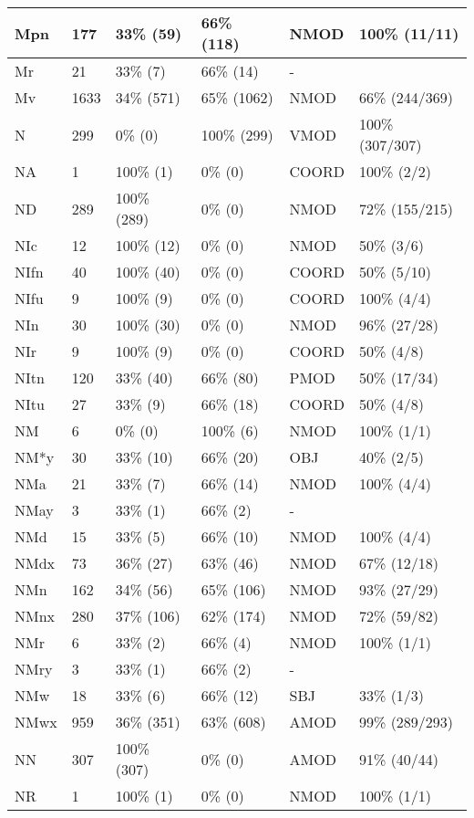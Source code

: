 \begin{figure*}
\begin{tabular}{|l|l|l|l||l|l|}
\hline
 Mpn & 177 & 33\% (59) & 66\% (118) & NMOD & 100\% (11/11) \\ 
\hline
 Mr & 21 & 33\% (7) & 66\% (14) & - &  \\ 
\hline
 Mv & 1633 & 34\% (571) & 65\% (1062) & NMOD & 66\% (244/369) \\ 
\hline
 N & 299 & 0\% (0) & 100\% (299) & VMOD & 100\% (307/307) \\ 
\hline
 NA & 1 & 100\% (1) & 0\% (0) & COORD & 100\% (2/2) \\ 
\hline
 ND & 289 & 100\% (289) & 0\% (0) & NMOD & 72\% (155/215) \\ 
\hline
 NIc & 12 & 100\% (12) & 0\% (0) & NMOD & 50\% (3/6) \\ 
\hline
 NIfn & 40 & 100\% (40) & 0\% (0) & COORD & 50\% (5/10) \\ 
\hline
 NIfu & 9 & 100\% (9) & 0\% (0) & COORD & 100\% (4/4) \\ 
\hline
 NIn & 30 & 100\% (30) & 0\% (0) & NMOD & 96\% (27/28) \\ 
\hline
 NIr & 9 & 100\% (9) & 0\% (0) & COORD & 50\% (4/8) \\ 
\hline
 NItn & 120 & 33\% (40) & 66\% (80) & PMOD & 50\% (17/34) \\ 
\hline
 NItu & 27 & 33\% (9) & 66\% (18) & COORD & 50\% (4/8) \\ 
\hline
 NM & 6 & 0\% (0) & 100\% (6) & NMOD & 100\% (1/1) \\ 
\hline
 NM*y & 30 & 33\% (10) & 66\% (20) & OBJ & 40\% (2/5) \\ 
\hline
 NMa & 21 & 33\% (7) & 66\% (14) & NMOD & 100\% (4/4) \\ 
\hline
 NMay & 3 & 33\% (1) & 66\% (2) & - &  \\ 
\hline
 NMd & 15 & 33\% (5) & 66\% (10) & NMOD & 100\% (4/4) \\ 
\hline
 NMdx & 73 & 36\% (27) & 63\% (46) & NMOD & 67\% (12/18) \\ 
\hline
 NMn & 162 & 34\% (56) & 65\% (106) & NMOD & 93\% (27/29) \\ 
\hline
 NMnx & 280 & 37\% (106) & 62\% (174) & NMOD & 72\% (59/82) \\ 
\hline
 NMr & 6 & 33\% (2) & 66\% (4) & NMOD & 100\% (1/1) \\ 
\hline
 NMry & 3 & 33\% (1) & 66\% (2) & - &  \\ 
\hline
 NMw & 18 & 33\% (6) & 66\% (12) & SBJ & 33\% (1/3) \\ 
\hline
 NMwx & 959 & 36\% (351) & 63\% (608) & AMOD & 99\% (289/293) \\ 
\hline
 NN & 307 & 100\% (307) & 0\% (0) & AMOD & 91\% (40/44) \\ 
\hline
 NR & 1 & 100\% (1) & 0\% (0) & NMOD & 100\% (1/1) \\ 
\hline
\end{tabular}
\end{figure*}
